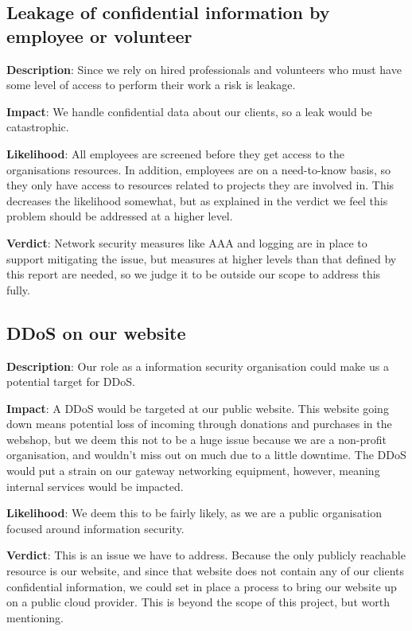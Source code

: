 \subsection{Leakage of confidential information by employee or volunteer}

\textbf{Description}: Since we rely on hired professionals and volunteers who must have some level of access to perform their work a risk is leakage.

\textbf{Impact}: We handle confidential data about our clients, so a leak would be catastrophic.

\textbf{Likelihood}: All employees are screened before they get access to the organisations resources. In addition, employees are on a need-to-know basis, so they only have access to resources related to projects they are involved in. This decreases the likelihood somewhat, but as explained in the verdict we feel this problem should be addressed at a higher level.

\textbf{Verdict}: Network security measures like AAA and logging are in place to support mitigating the issue, but measures at higher levels than that defined by this report are needed, so we judge it to be outside our scope to address this fully.

\subsection{DDoS on our website}

\textbf{Description}: Our role as a information security organisation could make us a potential target for DDoS.

\textbf{Impact}: A DDoS would be targeted at our public website. This website going down means potential loss of incoming through donations and purchases in the webshop, but we deem this not to be a huge issue because we are a non-profit organisation, and wouldn't miss out on much due to a little downtime. The DDoS would put a strain on our gateway networking equipment, however, meaning internal services would be impacted.

\textbf{Likelihood}: We deem this to be fairly likely, as we are a public organisation focused around information security.

\textbf{Verdict}: This is an issue we have to address. Because the only publicly reachable resource is our website, and since that website does not contain any of our clients confidential information, we could set in place a process to bring our website up on a public cloud provider. This is beyond the scope of this project, but worth mentioning. 



